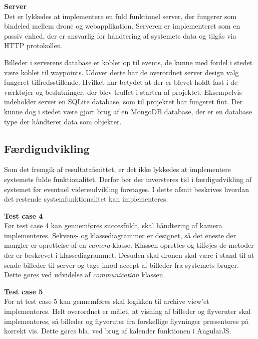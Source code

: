 \newpage

\textbf{Server}\\
Det er lykkedes at implementere en fuld funktionel server, der fungerer som bindeled mellem drone og webapplikation. Serveren er implementeret som en passiv enhed, der er ansvarlig for håndtering af systemets data og tilgås via HTTP protokollen. 

Billeder i serverens database er koblet op til events, de kunne med fordel i stedet være koblet til waypoints. Udover dette har de overordnet server design valg fungeret tilfredsstillende. Hvilket har betydet at der er blevet holdt fast i de værktøjer og beslutninger, der blev truffet i starten af projektet. Eksempelvis indeholder server en SQLite database, som til projektet har fungeret fint. Der kunne dog i stedet være gjort brug af en MongoDB database, der er en database type der håndterer data som objekter.

\vspace{0.5cm}

\subsection{Færdigudvikling}

Som det fremgik af resultatafsnittet, er det ikke lykkedes at implementere systemets fulde funktionalitet. Derfor bør der inversteres tid i færdigudvikling af systemet før eventuel videreudvikling foretages. I dette afsnit beskrives hvordan det restende systemfunktionalitet kan implementeres. 

\textbf{Test case 4}  \\
Før test case 4 kan gennemføres succesfuldt, skal håndtering af kamera implementeres.
Sekvens- og klassediagrammer er designet, så det eneste der mangler er oprettelse af en \textit{camera} klasse. Klassen oprettes og tilføjes de metoder der er beskrevet i klassediagrammet. Desuden skal dronen skal være i stand til at sende billeder til server og tage imod accept af billeder fra systemets bruger. Dette gøres ved udvidelse af \textit{communication} klassen. 

\textbf{Test case 5} \\
For at test case 5 kan gennemføres skal logikken til archive view'et implementeres. 
Helt overordnet er målet, at visning af billeder og flyveruter skal implementeres, så billeder og flyveruter fra forskellige flyvninger præsenteres på korrekt vis. Dette gøres bla. ved brug af kalender funktionen i AngularJS. 


